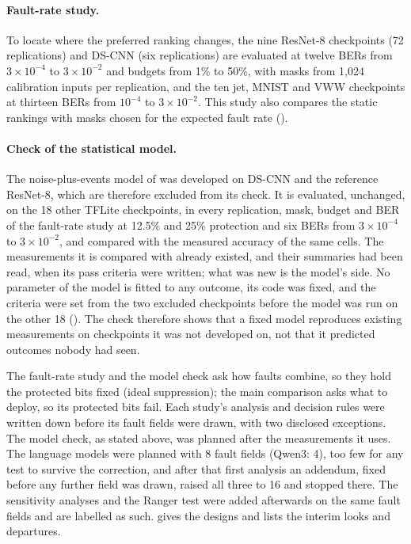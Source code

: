 \paragraph{Fault-rate study.} To locate where the preferred ranking changes, the nine ResNet-8 checkpoints (72 replications) and DS-CNN (six replications) are evaluated at twelve BERs from $3\times10^{-4}$ to $3\times10^{-2}$ and budgets from 1\% to 50\%, with masks from 1,024 calibration inputs per replication, and the ten jet, MNIST and VWW checkpoints at thirteen BERs from $10^{-4}$ to $3\times10^{-2}$. This study also compares the static rankings with masks chosen for the expected fault rate ().

\paragraph{Check of the statistical model.} The noise-plus-events model of  was developed on DS-CNN and the reference ResNet-8, which are therefore excluded from its check. It is evaluated, unchanged, on the 18 other TFLite checkpoints, in every replication, mask, budget and BER of the fault-rate study at 12.5\% and 25\% protection and six BERs from $3\times10^{-4}$ to $3\times10^{-2}$, and compared with the measured accuracy of the same cells. The measurements it is compared with already existed, and their summaries had been read, when its pass criteria were written; what was new is the model's side. No parameter of the model is fitted to any outcome, its code was fixed, and the criteria were set from the two excluded checkpoints before the model was run on the other 18 (). The check therefore shows that a fixed model reproduces existing measurements on checkpoints it was not developed on, not that it predicted outcomes nobody had seen.

The fault-rate study and the model check ask how faults combine, so they hold the protected bits fixed (ideal suppression); the main comparison asks what to deploy, so its protected bits fail. Each study's analysis and decision rules were written down before its fault fields were drawn, with two disclosed exceptions. The model check, as stated above, was planned after the measurements it uses. The language models were planned with 8 fault fields (Qwen3: 4), too few for any test to survive the correction, and after that first analysis an addendum, fixed before any further field was drawn, raised all three to 16 and stopped there. The sensitivity analyses and the Ranger test were added afterwards on the same fault fields and are labelled as such.  gives the designs and lists the interim looks and departures.

